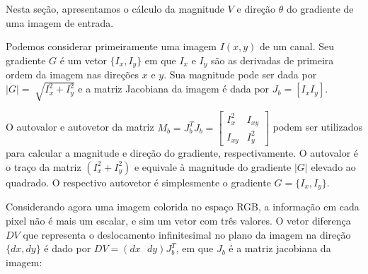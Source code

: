 Nesta seção, apresentamos o cálculo da magnitude $V$ e direção $\theta$ do gradiente
de uma imagem de entrada. 

Podemos considerar primeiramente uma imagem $I(x,y)$ de um canal. Seu gradiente $G$ é um vetor $ \{I_{x},I_{y}\}$ em que $I_x$ e $I_y$ são as derivadas de primeira ordem da imagem nas direções $x$ e $y$. Sua magnitude pode ser dada por $|G| = \sqrt[]{I_x^2 +I_y^2}$ e a matriz Jacobiana da imagem é dada por $J_b = [I_x I_y]$.

O autovalor e autovetor da matriz $ M_b = J_b^T J_b = \begin{bmatrix} I_x^2 & I_{xy} \\ I_{xy} & I_y^2 \end{bmatrix} $ podem ser utilizados para calcular a magnitude e direção do gradiente, respectivamente. O autovalor é o traço da matriz $(I_x^2 + I_y^2)$ e equivale à magnitude do gradiente $|G|$ elevado ao quadrado. O respectivo autovetor é simplesmente o gradiente $G = \{I_x, I_y\}$.

Considerando agora uma imagem colorida no espaço RGB, a informação em cada pixel não é mais um escalar, e sim um vetor com três valores. O vetor diferença $DV$ que representa o deslocamento infinitesimal no plano da imagem na direção $\{dx,dy\}$ é dado por $DV = (dx \text{ } dy)J_b^T$, em que $J_b$ é a matriz jacobiana da imagem:

